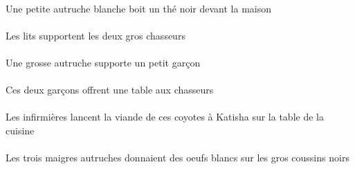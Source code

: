 \begin{exe}
\INDSgErgP{}   \petitBSgP{}   \blancBSgP{}   \autrucheBSgErgP{}    \DEFSgOblP{}   \maisonDSgOblP{}   \DEVANTP{}   \INDSgAbsP{}   \noirBSgP{}   \theBSgAbsP{}  \boireVtPrsBSgP{}\\
Une petite autruche blanche boit un thé noir devant la maison
\ex\gll
\DEFPlErg{}   \litDPlErg{}   \DEFDuAbs{}   \grosCDu{}   \chasseurCDuAbs{}  \supporterVtPrsCDu{}\\
\DEFPlErgP{}   \litDPlErgP{}   \DEFDuAbsP{}   \grosCDuP{}   \chasseurCDuAbsP{}  \supporterVtPrsCDuP{}\\
Les lits supportent les deux gros chasseurs
\ex\gll
\INDSgErg{}   \grosBSg{}   \autrucheBSgErg{}   \INDSgAbs{}   \petitDSg{}   \garconDSgAbs{}  \supporterVtPrsDSg{}\\
\INDSgErgP{}   \grosBSgP{}   \autrucheBSgErgP{}   \INDSgAbsP{}   \petitDSgP{}   \garconDSgAbsP{}  \supporterVtPrsDSgP{}\\
Une grosse autruche supporte un petit garçon
\ex\gll
\DEMDuErg{}   \garconDDuErg{}    \DEFPlDat{}   \chasseurCPlDat{}   \INDSgAbs{}   \tableDSgAbs{}  \offrirVdPrsDSg{}\\
\DEMDuErgP{}   \garconDDuErgP{}    \DEFPlDatP{}   \chasseurCPlDatP{}   \INDSgAbsP{}   \tableDSgAbsP{}  \offrirVdPrsDSgP{}\\
Ces deux garçons offrent une table aux chasseurs
\ex\gll
\DEFSgObl{}    \DEFSgObl{}   \cuisineDSgObl{}   \DE{}   \tableDSgObl{}   \SUR{}   \DEFPlErg{}   \infirmiereAPlErg{}    \INDSgDat{}   \KatishaASgDat{}   \DEFSgAbs{}    \DEMPlObl{}   \coyoteCPlObl{}   \DE{}   \viandeASgAbs{}  \lancerVdPrsASg{}\\
\DEFSgOblP{}    \DEFSgOblP{}   \cuisineDSgOblP{}   \DEP{}   \tableDSgOblP{}   \SURP{}   \DEFPlErgP{}   \infirmiereAPlErgP{}    \INDSgDatP{}   \KatishaASgDatP{}   \DEFSgAbsP{}    \DEMPlOblP{}   \coyoteCPlOblP{}   \DEP{}   \viandeASgAbsP{}  \lancerVdPrsASgP{}\\
Les infirmières lancent la viande de ces coyotes à Katisha sur la table de la cuisine
\ex\gll
\DEFPlObl{}   \grosBPl{}   \noirBPl{}   \coussinBPlObl{}   \SUR{}   \DEFPlErg{}   \troisBPl{}   \maigreBPl{}   \autrucheBPlErg{}   \INDPlAbs{}   \blancCPl{}   \oeufCPlAbs{}  \donnerVdPstCPl{}\\
\DEFPlOblP{}   \grosBPlP{}   \noirBPlP{}   \coussinBPlOblP{}   \SURP{}   \DEFPlErgP{}   \troisBPlP{}   \maigreBPlP{}   \autrucheBPlErgP{}   \INDPlAbsP{}   \blancCPlP{}   \oeufCPlAbsP{}  \donnerVdPstCPlP{}\\
Les trois maigres autruches donnaient des oeufs blancs sur les gros coussins noirs

\end{exe}
